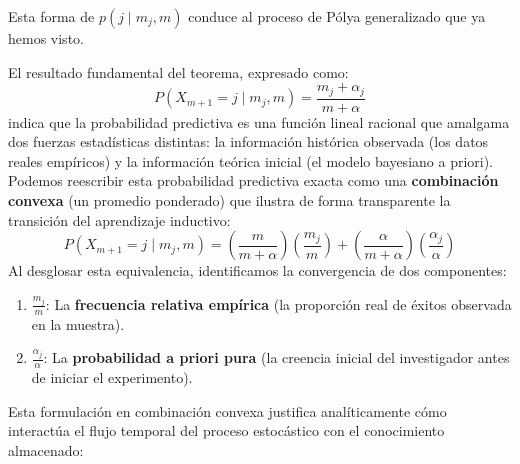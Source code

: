 
\begin{observacion}
    Esta forma de $p(j \mid m_j, m)$ conduce al proceso de Pólya generalizado que ya hemos visto.
\end{observacion}

\noindent
El resultado fundamental del teorema, expresado como:
\begin{equation*}
    P(X_{m+1} = j \mid m_j, m) = \frac{m_j + \alpha_j}{m + \alpha}
\end{equation*}
indica que la probabilidad predictiva es una función lineal racional que amalgama dos fuerzas estadísticas distintas: la información histórica observada (los datos reales empíricos) y la información teórica inicial (el modelo bayesiano a priori). \\

\noindent
Podemos reescribir esta probabilidad predictiva exacta como una \textbf{combinación convexa} (un promedio ponderado) que ilustra de forma transparente la transición del aprendizaje inductivo:
\begin{equation*}
    P(X_{m+1} = j \mid m_j, m) = \left( \frac{m}{m + \alpha} \right) \left( \frac{m_j}{m} \right) + \left( \frac{\alpha}{m + \alpha} \right) \left( \frac{\alpha_j}{\alpha} \right)
\end{equation*}
Al desglosar esta equivalencia, identificamos la convergencia de dos componentes:
\begin{enumerate}
    \item $\frac{m_j}{m}$: La \textbf{frecuencia relativa empírica} (la proporción real de éxitos observada en la muestra).
    \item $\frac{\alpha_j}{\alpha}$: La \textbf{probabilidad a priori pura} (la creencia inicial del investigador antes de iniciar el experimento).
\end{enumerate}
Esta formulación en combinación convexa justifica analíticamente cómo interactúa el flujo temporal del proceso estocástico con el conocimiento almacenado:

